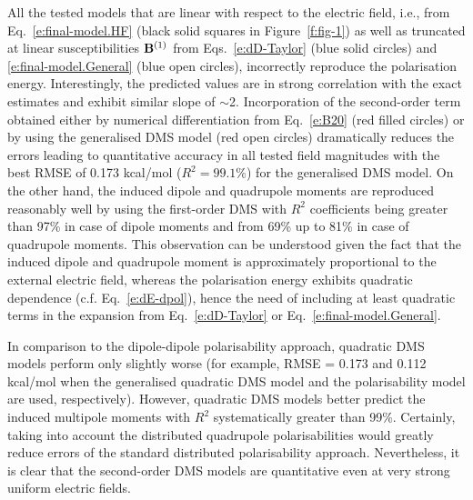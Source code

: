 \documentclass[aip,amsmath,amssymb,reprint,floatfix]{revtex4-1}
\begin{document}
All the tested models that are linear with respect to the electric field,
i.e., from Eq.~\eqref{e:final-model.HF} (black solid squares in Figure~\ref{f:fig-1}) 
as well as truncated at linear susceptibilities ${\bf B}^{(1)}$ 
from Eqs.~\eqref{e:dD-Taylor} (blue solid circles) and \eqref{e:final-model.General} (blue open circles),
incorrectly reproduce the polarisation energy.
Interestingly, the predicted values are in strong
correlation with the exact estimates and exhibit similar slope of $\sim$2.
Incorporation of the second\hyp{}order term
obtained either by numerical differentiation from Eq.~\eqref{e:B20} (red filled circles) 
or by using the generalised DMS model (red open circles)
dramatically reduces the errors
leading to quantitative accuracy in all tested field magnitudes 
with the best RMSE of 0.173 kcal/mol ($R^2=99.1\%$) for the generalised DMS model.
On the other hand, the
induced dipole and quadrupole moments are reproduced reasonably well by
using the first\hyp{}order DMS with $R^2$ coefficients being 
greater than 97\% in case of dipole moments and from 69\% up to 81\% in case of quadrupole moments.
This observation can be understood given the fact that the induced dipole
and quadrupole moment is approximately proportional to the external electric field, whereas the polarisation
energy exhibits quadratic dependence (c.f. Eq.~\eqref{e:dE-dpol}), hence the need of including at least
quadratic terms in the expansion from Eq.~\eqref{e:dD-Taylor} or Eq.~\eqref{e:final-model.General}. 

In comparison to the dipole\hyp{}dipole polarisability approach, 
quadratic DMS models perform only slightly worse 
(for example, RMSE = 0.173 and 0.112 kcal/mol when the generalised quadratic DMS
model and the polarisability model are used, respectively).
However, quadratic DMS models better predict the induced multipole moments with
$R^2$ systematically greater than 99\%. 
Certainly, taking into account the distributed quadrupole polarisabilities
would greatly reduce errors of the standard distributed polarisability approach.
Nevertheless, it is clear that the second\hyp{}order
DMS models are quantitative even at very strong uniform electric fields.
\end{document}
